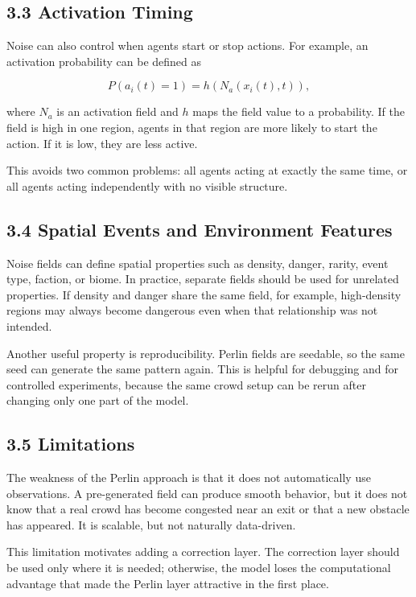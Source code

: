 \documentclass[
  11pt,
]{article}
\begin{document}
\subsection{3.3 Activation Timing}\label{activation-timing}

Noise can also control when agents start or stop actions. For example,
an activation probability can be defined as

\[
P(a_i(t)=1) = h(N_a(x_i(t),t)),
\]

where \(N_a\) is an activation field and \(h\) maps the field value to a
probability. If the field is high in one region, agents in that region
are more likely to start the action. If it is low, they are less active.

This avoids two common problems: all agents acting at exactly the same
time, or all agents acting independently with no visible structure.

\subsection{3.4 Spatial Events and Environment
Features}\label{spatial-events-and-environment-features}

Noise fields can define spatial properties such as density, danger,
rarity, event type, faction, or biome. In practice, separate fields
should be used for unrelated properties. If density and danger share the
same field, for example, high-density regions may always become
dangerous even when that relationship was not intended.

Another useful property is reproducibility. Perlin fields are seedable,
so the same seed can generate the same pattern again. This is helpful
for debugging and for controlled experiments, because the same crowd
setup can be rerun after changing only one part of the model.

\subsection{3.5 Limitations}\label{limitations}

The weakness of the Perlin approach is that it does not automatically
use observations. A pre-generated field can produce smooth behavior, but
it does not know that a real crowd has become congested near an exit or
that a new obstacle has appeared. It is scalable, but not naturally
data-driven.

This limitation motivates adding a correction layer. The correction
layer should be used only where it is needed; otherwise, the model loses
the computational advantage that made the Perlin layer attractive in the
first place.
\end{document}
